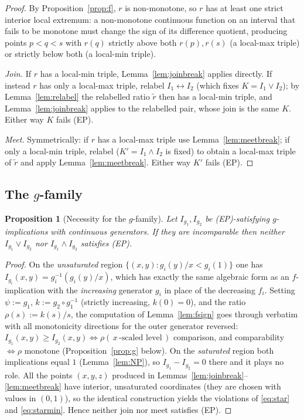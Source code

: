 \documentclass{amsart}
\theoremstyle{plain}
\newtheorem{proposition}{Proposition}
\theoremstyle{definition}
\begin{document}
\begin{proof}
By Proposition~\ref{prop:f}, $r$ is non-monotone, so $r$ has at least one strict interior
local extremum: a non-monotone continuous function on an interval that fails to be monotone
must change the sign of its difference quotient, producing points $p<q<s$ with $r(q)$
strictly above both $r(p),r(s)$ (a local-max triple) or strictly below both (a local-min
triple).

\emph{Join.}  If $r$ has a local-min triple, Lemma~\ref{lem:joinbreak} applies directly.
If instead $r$ has only a local-max triple, relabel $I_1\leftrightarrow I_2$
(which fixes $K=I_1\vee I_2$); by Lemma~\ref{lem:relabel} the relabelled ratio $\tilde r$
then has a local-min triple, and Lemma~\ref{lem:joinbreak} applies to the relabelled pair,
whose join is the same $K$.  Either way $K$ fails (EP).

\emph{Meet.}  Symmetrically: if $r$ has a local-max triple use
Lemma~\ref{lem:meetbreak}; if only a local-min triple, relabel
($K'=I_1\wedge I_2$ is fixed) to obtain a local-max triple of $\tilde r$ and apply
Lemma~\ref{lem:meetbreak}.  Either way $K'$ fails (EP).
\end{proof}

\subsection{The $g$-family}

\begin{proposition}[Necessity for the $g$-family]\label{prop:nec-g}
Let $I_{g_1},I_{g_2}$ be \textup{(EP)}-satisfying $g$-implications with continuous
generators.  If they are incomparable then neither $I_{g_1}\vee I_{g_2}$ nor
$I_{g_1}\wedge I_{g_2}$ satisfies \textup{(EP)}.
\end{proposition}

\begin{proof}
On the \emph{unsaturated} region $\{(x,y):g_i(y)/x<g_i(1)\}$ one has
$I_{g_i}(x,y)=g_i^{-1}(g_i(y)/x)$, which has exactly the same algebraic form as an
$f$-implication with the \emph{increasing} generator $g_i$ in place of the decreasing $f_i$.
Setting $\psi:=g_1$, $k:=g_2\circ g_1^{-1}$ (strictly increasing, $k(0)=0$), and the ratio
$\rho(s):=k(s)/s$, the computation of Lemma~\ref{lem:fsign} goes through verbatim with all
monotonicity directions for the outer generator reversed: $I_{g_1}(x,y)\ge I_{g_2}(x,y)\iff
\rho(\,x\,\text{-scaled level}\,)$ comparison, and comparability $\iff\rho$ monotone
(Proposition~\ref{prop:g} below).  On the \emph{saturated} region both implications equal
$1$ (Lemma~\ref{lem:NP}), so $I_{g_1}-I_{g_2}=0$ there and it plays no role.  All the
points $(x,y,z)$ produced in Lemmas~\ref{lem:joinbreak}--\ref{lem:meetbreak} have interior,
unsaturated coordinates (they are chosen with values in $(0,1)$), so the identical
construction yields the violations of \eqref{eq:star} and \eqref{eq:starmin}.  Hence neither
join nor meet satisfies (EP).
\end{proof}
\end{document}
